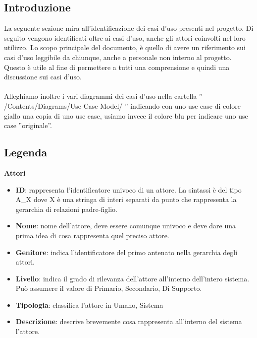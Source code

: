 \setlength{\arrayrulewidth}{.5mm}
\setlength{\tabcolsep}{5pt}
\renewcommand{\arraystretch}{2}
\renewcommand{\labelenumii}{\theenumii}
\renewcommand{\theenumii}{\theenumi.\arabic{enumii}.}

\newcommand{\lastUC}{\theucCounter}
\newcommand{\nextUC}{\stepcounter{ucCounter}{\theucCounter}}


\subsection{Introduzione}
La seguente sezione mira all'identificazione dei casi d'uso presenti nel progetto. Di seguito vengono identificati oltre ai casi d'uso, anche gli attori coinvolti nel loro utilizzo.
Lo scopo principale del documento, è quello di avere un riferimento sui casi d'uso leggibile da chiunque, anche a personale non interno al progetto. Questo è utile al fine di permettere a tutti una comprensione e quindi una discussione sui casi d'uso.\\\\
Alleghiamo inoltre i vari diagrammi dei casi d'uso nella cartella '' /Contents/Diagrams/Use Case Model/ '' indicando con uno use case di colore giallo una copia di uno use case, usiamo invece il colore blu per indicare uno use case ''originale''.

\subsection{Legenda}
\large{\textbf{Attori}} \\
\begin{itemize}[]
	\item \textbf{ID}: rappresenta l'identificatore univoco di un attore. La sintassi è del tipo A\_X dove X è una stringa di interi separati da punto che rappresenta la gerarchia di relazioni padre-figlio.
	\item \textbf{Nome}: nome dell'attore, deve essere comunque univoco e deve dare una prima idea di cosa rappresenta quel preciso attore.
	\item \textbf{Genitore}: indica l'identificatore del primo antenato nella gerarchia degli attori.
	\item \textbf{Livello}: indica il grado di rilevanza dell'attore all'interno dell'intero sistema. Può assumere il valore di {Primario, Secondario, Di Supporto}.
	\item \textbf{Tipologia}: classifica l'attore in {Umano, Sistema}
	\item \textbf{Descrizione}: descrive brevemente cosa rappresenta all'interno del sistema l'attore.\
\end{itemize}


